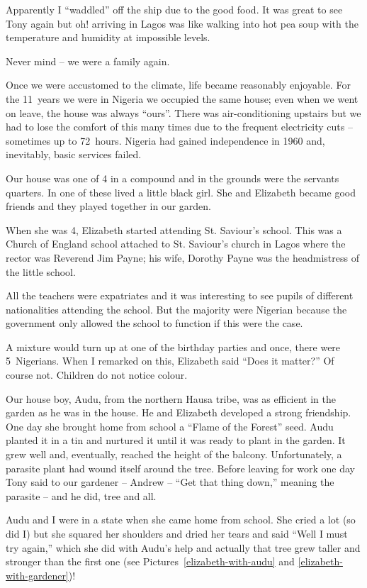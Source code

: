 Apparently I ``waddled'' off the ship due to the good food. It was
great to see Tony again but oh! arriving in Lagos was like walking
into hot pea soup with the temperature and humidity at impossible
levels.

Never mind -- we were a family again.

Once we were accustomed to the climate, life became reasonably
enjoyable. For the 11~years we were in Nigeria we occupied the same
house; even when we went on leave, the house was always
``ours''. There was air-conditioning upstairs but we had to lose the
comfort of this many times due to the frequent electricity cuts --
sometimes up to 72~hours. Nigeria had gained independence in 1960 and,
inevitably, basic services failed.

Our house was one of 4 in a compound and in the grounds were the
servants quarters. In one of these lived a little black girl. She and
Elizabeth became good friends and they played together in our garden.

When she was 4, Elizabeth started attending St. Saviour's school. This
was a Church of England school attached to St. Saviour's church in
Lagos where the rector was Reverend Jim Payne; his wife, Dorothy Payne
was the headmistress of the little school.

All the teachers were expatriates and it was interesting to see pupils
of different nationalities attending the school. But the majority were
Nigerian because the government only allowed the school to function if
this were the case.

A mixture would turn up at one of the birthday parties and once, there
were 5~Nigerians. When I remarked on this, Elizabeth said ``Does it
matter?'' Of course not. Children do not notice colour.

Our house boy, Audu, from the northern Hausa tribe, was as efficient
in the garden as he was in the house. He and Elizabeth developed a
strong friendship. One day she brought home from school a ``Flame of
the Forest'' seed. Audu planted it in a tin and nurtured it until it
was ready to plant in the garden. It grew well and, eventually,
reached the height of the balcony. Unfortunately, a parasite plant had
wound itself around the tree. Before leaving for work one day Tony
said to our gardener -- Andrew -- ``Get that thing down,'' meaning the
parasite -- and he did, tree and all.

Audu and I were in a state when she came home from school. She cried a
lot (so did I) but she squared her shoulders and dried her tears and
said ``Well I must try again,'' which she did with Audu's help and
actually that tree grew taller and stronger than the first one (see
Pictures~\ref{elizabeth-with-audu} and \ref{elizabeth-with-gardener})!

